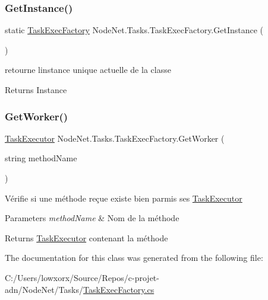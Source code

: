 \subsubsection{\texorpdfstring{Get\+Instance()}{GetInstance()}}
{\footnotesize\ttfamily static \hyperlink{class_node_net_1_1_tasks_1_1_task_exec_factory}{Task\+Exec\+Factory} Node\+Net.\+Tasks.\+Task\+Exec\+Factory.\+Get\+Instance (\begin{DoxyParamCaption}{ }\end{DoxyParamCaption})\hspace{0.3cm}{\ttfamily [static]}}



retourne l\textquotesingle{}instance unique actuelle de la classe 

\begin{DoxyReturn}{Returns}
Instance
\end{DoxyReturn}
\mbox{\label{class_node_net_1_1_tasks_1_1_task_exec_factory_a81820ad209deb0ded20668f8c7799ba5}} 
\subsubsection{\texorpdfstring{Get\+Worker()}{GetWorker()}}
{\footnotesize\ttfamily \hyperlink{class_node_net_1_1_tasks_1_1_task_executor}{Task\+Executor} Node\+Net.\+Tasks.\+Task\+Exec\+Factory.\+Get\+Worker (\begin{DoxyParamCaption}\item[{string}]{method\+Name }\end{DoxyParamCaption})}



Vérifie si une méthode reçue existe bien parmis ses \hyperlink{class_node_net_1_1_tasks_1_1_task_executor}{Task\+Executor} 


\begin{DoxyParams}{Parameters}
{\em method\+Name} & Nom de la méthode\\
\hline
\end{DoxyParams}
\begin{DoxyReturn}{Returns}
\hyperlink{class_node_net_1_1_tasks_1_1_task_executor}{Task\+Executor} contenant la méthode
\end{DoxyReturn}


The documentation for this class was generated from the following file\+:\begin{DoxyCompactItemize}
\item 
C\+:/\+Users/lowxorx/\+Source/\+Repos/c-\/projet-\/adn/\+Node\+Net/\+Tasks/\hyperlink{_task_exec_factory_8cs}{Task\+Exec\+Factory.\+cs}\end{DoxyCompactItemize}
